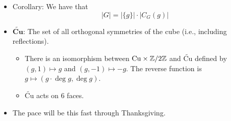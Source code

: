 \documentclass[../notes.tex]{subfiles}
\begin{document}
\begin{itemize}
\begin{itemize}
    \end{itemize}
    \item Corollary: We have that
    \begin{equation*}
        |G| = |\{g\}|\cdot|C_G(g)|
    \end{equation*}
    \item $\bm{\widetilde{\textbf{Cu}}}$: The set of all orthogonal symmetries of the cube (i.e., including reflections).
    \begin{itemize}
        \item There is an isomorphism between $\text{Cu}\times\mathbb{Z}/2\mathbb{Z}$ and $\widetilde{\text{Cu}}$ defined by $(g,1)\mapsto g$ and $(g,-1)\mapsto -g$. The reverse function is $g\mapsto(g\cdot\deg g,\deg g)$.
        \item $\widetilde{\text{Cu}}$ acts on 6 faces.
    \end{itemize}
    \item The pace will be this fast through Thanksgiving.
\end{itemize}
\end{document}
